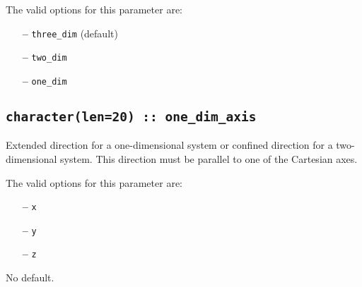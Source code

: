The valid options for this parameter are:
\begin{itemize}
\item[{\bf --}] \verb#three_dim#  (default)
\item[{\bf --}] \verb#two_dim#
\item[{\bf --}] \verb#one_dim#
\end{itemize}

\subsection[one\_dim\_axis]{\tt character(len=20) :: one\_dim\_axis}

Extended direction for a one-dimensional system
or confined direction for a two-dimensional system.
This direction must be parallel to one of the Cartesian axes.

The valid options for this parameter are:
\begin{itemize}
\item[{\bf --}] \verb#x#
\item[{\bf --}] \verb#y#
\item[{\bf --}] \verb#z#
\end{itemize}

No default.


%

